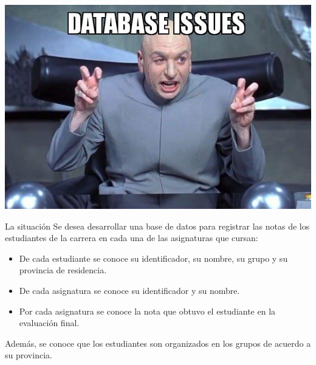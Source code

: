 {
{
    \includegraphics[width=\paperwidth,height=\paperheight]{img/database-issues.jpg}
}
\begin{frame}
\end{frame}
}

\begin{frame}{La situaci\'on}
    Se desea desarrollar una base de datos para registrar las notas
    de los estudiantes de la carrera en cada una de las asignaturas que
    cursan:
    \begin{itemize}
        \item De cada estudiante se conoce su identificador, su nombre, su grupo y su provincia de residencia.
        \item De cada asignatura se conoce su identificador y su nombre.
        \item Por cada asignatura se conoce la nota que obtuvo el estudiante en la evaluaci\'on final.
    \end{itemize}
    Adem\'as, se conoce que los estudiantes son organizados en los grupos de acuerdo a su provincia.
\end{frame}


